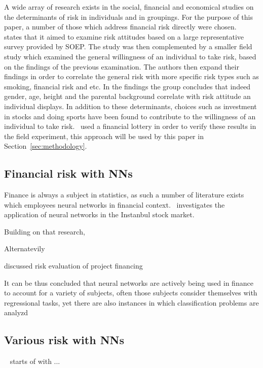 \documentclass{article}
\begin{document}
A wide array of research exists in the social, financial and economical studies on the determinants of risk in individuals and in groupings. For the purpose of this paper, a number of those which address financial risk directly were chosen.~\cite{individualRiskAttitudes} states that it aimed to examine risk attitudes based on a large representative survey provided by SOEP\@. The study was then complemented by a smaller field study which examined the general willingness of an individual to take risk, based on the findings of the previous examination. The authors then expand their findings in order to correlate the general risk with more specific risk types such as smoking, financial risk and etc. In the findings the group concludes that indeed gender, age, height and the parental background correlate with risk attitude an individual displays. In addition to these determinants, choices such as investment in stocks and doing sports have been found to contribute to the willingness of an individual to take risk.~\cite{individualRiskAttitudes} used a financial lottery in order to verify these results in the field experiment, this approach will be used by this paper in Section~\ref{sec:methodology}.


\subsection{Financial risk with NNs}
\label{sub:financial_risk_nn}

Finance is always a subject in statistics, as such a number of literature exists which employees neural networks in financial context.~\cite{instanbulStock} investigates the application of neural networks in the Instanbul stock market.

Building on that research, \cite{bitcoinNN}


Alternatevily~\cite{bbNN}

\cite{04443437.pdf} discussed risk evaluation of project financing

It can be thus concluded that neural networks are actively being used in finance to account for a variety of subjects, often those subjects consider themselves with regressional tasks, yet there are also instances in which classification problems are analyzd
\subsection{Various risk with NNs}
\label{sub:various_risk_nn}

~\cite{riskAssesmentInternalAuditing} starts of with ...
\end{document}

